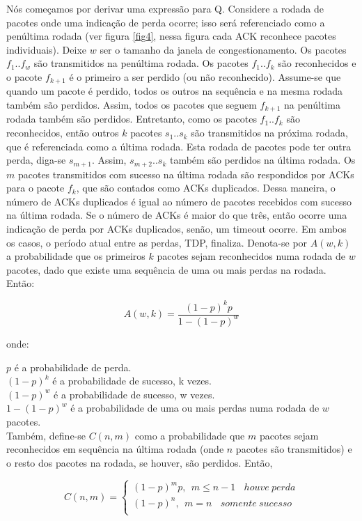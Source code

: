 Nós começamos por derivar uma expressão para Q. Considere a rodada de pacotes onde uma indicação de perda ocorre; isso será referenciado como a penúltima rodada (ver figura \ref{fig4}, nessa figura cada ACK reconhece pacotes individuais). Deixe $w$ ser o tamanho da janela de congestionamento. Os pacotes $f_1..f_w$ são transmitidos na penúltima rodada. Os pacotes $f_1..f_k$ são reconhecidos e o pacote $f_{k+1}$ é o primeiro a ser perdido (ou não reconhecido). Assume-se que quando um pacote é perdido, todos os outros na sequência e na mesma rodada também são perdidos. Assim, todos os pacotes que seguem $f_{k+1}$ na penúltima rodada também são perdidos. Entretanto, como os pacotes $f_1..f_k$ são reconhecidos, então outros $k$ pacotes $s_1..s_k$ são transmitidos na próxima rodada, que é referenciada como a última rodada. Esta rodada de pacotes pode ter outra perda, diga-se $s_{m+1}$. Assim, $s_{m+2}..s_k$ também são perdidos na última rodada. Os $m$ pacotes transmitidos com sucesso na última rodada são respondidos por ACKs para o pacote $f_k$, que são contados como ACKs duplicados. Dessa maneira, o número de ACKs duplicados é igual ao número de pacotes recebidos com sucesso na última rodada. Se o número de ACKs é maior do que três, então ocorre uma indicação de perda por ACKs duplicados, senão, um timeout ocorre. Em ambos os casos, o período atual entre as perdas, TDP, finaliza. Denota-se por $A(w,k)$ a probabilidade que os primeiros $k$ pacotes sejam reconhecidos numa rodada de $w$ pacotes, dado que existe uma sequência de uma ou mais perdas na rodada. Então:

$$A(w, k) = \frac{(1-p)^kp}{1-(1-p)^w} $$

onde:

$p$ é a probabilidade de perda. \\
$(1-p)^k$ é a probabilidade de sucesso, k vezes. \\
$(1-p)^w$ é a probabilidade de sucesso, w vezes. \\
$1 - (1-p)^w$ é a probabilidade de uma ou mais perdas numa rodada de $w$ pacotes. \\

Também, define-se $C(n,m)$ como a probabilidade que $m$ pacotes sejam reconhecidos em sequência na última rodada (onde $n$ pacotes são transmitidos) e o resto dos pacotes na rodada, se houver, são perdidos. Então,

$$C(n,m) = \begin{cases} 
  (1-p)^mp,  \ \  m \leq n - 1 \ \ \ \ houve \ perda\\
  (1-p)^n,  \ \  m = n \ \ \ \ somente \ sucesso\\
\end{cases}
 $$

